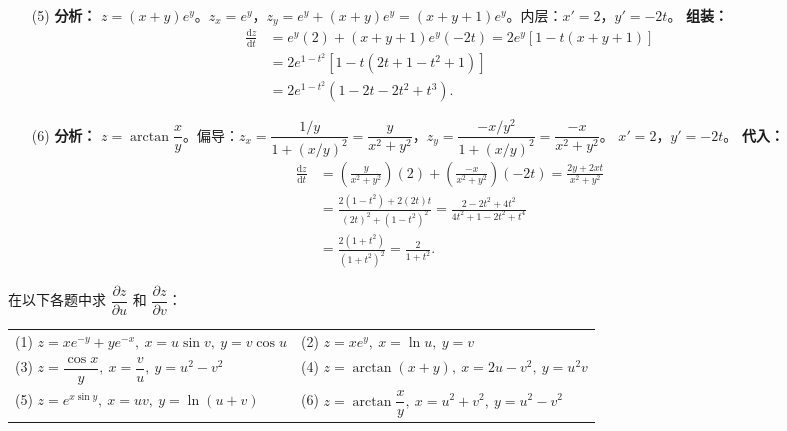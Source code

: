 \documentclass[lang=cn,11pt]{elegantbook}
\begin{document}
\begin{solution}
\begin{enumerate}
  \item[(5)] \textbf{分析：} $z=(x+y)e^y$。$z_x = e^y$，$z_y = e^y + (x+y)e^y = (x+y+1)e^y$。内层：$x'=2$，$y'=-2t$。
  \textbf{组装：}
  \begin{align*}
  \frac{\mathrm{d}z}{\mathrm{d}t} &= e^y(2) + (x+y+1)e^y(-2t) = 2e^y [1 - t(x+y+1)] \\
  &= 2e^{1-t^2} [1 - t(2t + 1 - t^2 + 1)] \\
  &= 2e^{1-t^2} (1 - 2t - 2t^2 + t^3).
  \end{align*}

  \item[(6)] \textbf{分析：} $z=\arctan\dfrac{x}{y}$。偏导：$z_x = \dfrac{1/y}{1+(x/y)^2} = \dfrac{y}{x^2+y^2}$，$z_y = \dfrac{-x/y^2}{1+(x/y)^2} = \dfrac{-x}{x^2+y^2}$。
  $x'=2$，$y'=-2t$。
  \textbf{代入：}
  \begin{align*}
  \frac{\mathrm{d}z}{\mathrm{d}t} &= \left(\frac{y}{x^2+y^2}\right)(2) + \left(\frac{-x}{x^2+y^2}\right)(-2t) = \frac{2y + 2xt}{x^2+y^2} \\
  &= \frac{2(1-t^2) + 2(2t)t}{(2t)^2 + (1-t^2)^2} = \frac{2 - 2t^2 + 4t^2}{4t^2 + 1 - 2t^2 + t^4} \\
  &= \frac{2(1+t^2)}{(1+t^2)^2} = \frac{2}{1+t^2}.
  \end{align*}
\end{enumerate}
\end{solution}

\begin{exercise}[链式法则求偏导数]
在以下各题中求 $\dfrac{\partial z}{\partial u}$ 和 $\dfrac{\partial z}{\partial v}$：\\
\begin{tabular}{p{} p{}}
(1) $z = xe^{-y} + ye^{-x},\ x = u\sin v,\ y = v\cos u$ & (2) $z = xe^y,\ x = \ln u,\ y = v$ \\
(3) $z = \dfrac{\cos x}{y},\ x = \dfrac{v}{u},\ y = u^2-v^2$ & (4) $z = \arctan(x+y),\ x = 2u-v^2,\ y = u^2v$ \\
(5) $z = e^{x\sin y},\ x = uv,\ y = \ln(u+v)$ & (6) $z = \arctan\dfrac{x}{y},\ x = u^2+v^2,\ y = u^2-v^2$
\end{tabular}
\end{exercise}
\end{document}
